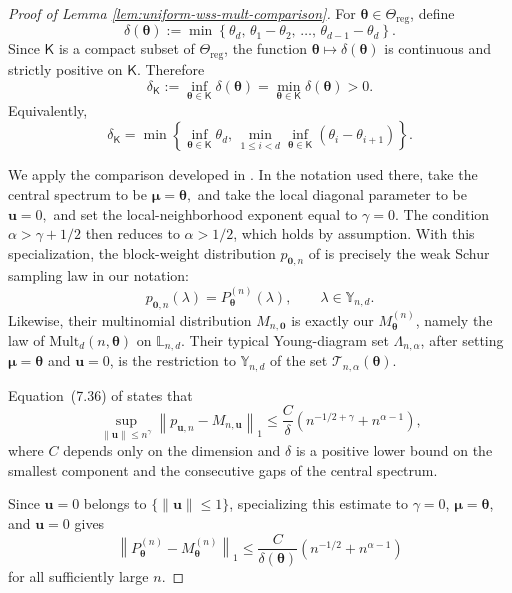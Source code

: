 \documentclass{article}
\theoremstyle{named}
\theoremstyle{named1}
\newcommand{\Mult}{\mathrm{Mult}}
\newcommand{\btheta}{\boldsymbol{\theta}}
\theoremstyle{plain}
\theoremstyle{remark}
\begin{document}
\begin{proof}[Proof of Lemma \ref{lem:uniform-wss-mult-comparison}]
For $\btheta\in\Theta_{\mathrm{reg}}$, define
\begin{equation}
\label{eq:delta-theta-definition}
\delta(\btheta)
:=
\min\left\{
    \theta_d,\,
    \theta_1-\theta_2,\,
    \ldots,\,
    \theta_{d-1}-\theta_d
\right\}.
\end{equation}
Since $\mathsf K$ is a compact subset of
$\Theta_{\mathrm{reg}}$, the function
$\btheta\mapsto\delta(\btheta)$ is continuous and strictly positive
on $\mathsf K$. Therefore
\begin{equation}
\label{eq:delta-K-definition}
\delta_{\mathsf K}
:=
\inf_{\btheta\in\mathsf K}\delta(\btheta)
=
\min_{\btheta\in\mathsf K}\delta(\btheta)
>0.
\end{equation}
Equivalently,
\[
\delta_{\mathsf K}
=
\min\left\{
    \inf_{\btheta\in\mathsf K}\theta_d,\,
    \min_{1\leq i<d}
    \inf_{\btheta\in\mathsf K}
        (\theta_i-\theta_{i+1})
\right\}.
\]

We apply the comparison developed in
\cite[Section~7.5]{Kahn&Guta}. In the notation used there, take the
central spectrum to be
$\boldsymbol\mu=\btheta,$ and 
take the local diagonal parameter to be
$\mathbf u=0,
$
and set the local-neighborhood exponent equal to
$\gamma=0.$
The condition $\alpha>\gamma+1/2$ then reduces to
$\alpha>1/2$, which holds by assumption. With this specialization, the block-weight distribution
$p_{\mathbf 0,n}$ of \cite{Kahn&Guta} is precisely the weak Schur
sampling law in our notation:
\[
    p_{\mathbf 0,n}(\lambda)
    =
    P_{\btheta}^{(n)}(\lambda),
    \qquad
    \lambda\in\mathbb Y_{n,d}.
\]
Likewise, their multinomial distribution $M_{n,\mathbf 0}$ is exactly
our $M_{\btheta}^{(n)}$, namely the law of
$\Mult_d(n,\btheta)$ on $\mathbb L_{n,d}$.
Their typical Young-diagram set $\Lambda_{n,\alpha}$, after setting
$\boldsymbol\mu=\btheta$ and $\mathbf u=0$, is the restriction to
$\mathbb Y_{n,d}$ of the set
$\mathcal T_{n,\alpha}(\btheta)$.

Equation~(7.36) of \cite{Kahn&Guta} states that
\[
\sup_{\|\mathbf u\|\leq n^\gamma}
\left\|
    p_{\mathbf u,n}-M_{n,\mathbf u}
\right\|_1
\leq
\frac{C}{\delta}
\left(
    n^{-1/2+\gamma}+n^{\alpha-1}
\right),
\]
where $C$ depends only on the dimension and $\delta$ is a positive
lower bound on the smallest component and the consecutive gaps of
the central spectrum.

Since $\mathbf u=0$ belongs to
$\{\|\mathbf u\|\leq1\}$, specializing this estimate to
$\gamma=0$, $\boldsymbol\mu=\btheta$, and $\mathbf u=0$ gives
\begin{equation}
\label{eq:pointwise-wss-mult-bound}
\left\|
    P_{\btheta}^{(n)}-M_{\btheta}^{(n)}
\right\|_1
\leq
\frac{C}{\delta(\btheta)}
\left(
    n^{-1/2}+n^{\alpha-1}
\right)
\end{equation}
for all sufficiently large $n$.


\end{proof}
\end{document}
